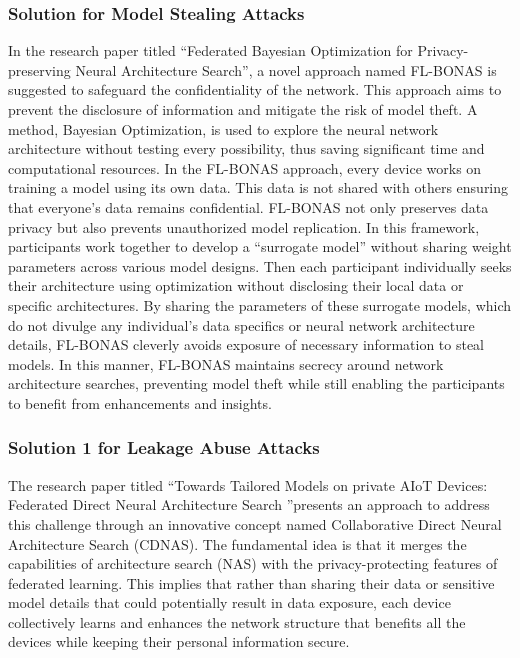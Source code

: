 \documentclass[conference]{IEEEtran}
\begin{document}
\subsubsection{\textbf{Solution for Model Stealing Attacks}}
In the research paper titled \enquote{Federated Bayesian Optimization for Privacy-preserving Neural Architecture Search}, a novel approach named FL-BONAS is suggested to safeguard the confidentiality of the network. This approach aims to prevent the disclosure of information and mitigate the risk of model theft. A method, Bayesian Optimization, is used to explore the neural network architecture without testing every possibility, thus saving significant time and computational resources. In the FL-BONAS approach, every device works on training a model using its own data. This data is not shared with others ensuring that everyone's data remains confidential. 
FL-BONAS not only preserves data privacy but also prevents unauthorized model replication. In this framework, participants work together to develop a \enquote{surrogate model} without sharing weight parameters across various model designs. Then each participant individually seeks their architecture using optimization without disclosing their local data or specific architectures. By sharing the parameters of these surrogate models, which do not divulge any individual's data specifics or neural network architecture details, FL-BONAS cleverly avoids exposure of necessary information to steal models. In this manner, FL-BONAS maintains secrecy around network architecture searches, preventing model theft while still enabling the participants to benefit from enhancements and insights.


\subsubsection{\textbf{Solution 1 for Leakage Abuse Attacks}}
The research paper titled \enquote{Towards Tailored Models on private AIoT Devices: Federated Direct Neural Architecture Search
}presents an approach to address this challenge through an innovative concept named Collaborative Direct Neural Architecture Search (CDNAS). The fundamental idea is that it merges the capabilities of architecture search (NAS) with the privacy-protecting features of federated learning. This implies that rather than sharing their data or sensitive model details that could potentially result in data exposure, each device collectively learns and enhances the network structure that benefits all the devices while keeping their personal information secure.
\end{document}

